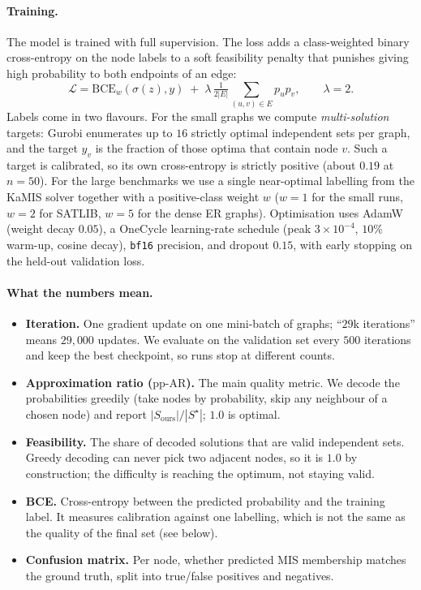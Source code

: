 \documentclass[10pt,a4paper]{article}
\newcommand{\ppar}{\mathrm{pp\text{-}AR}}
\begin{document}
\paragraph{Training.}
The model is trained with full supervision. The loss adds a class-weighted binary
cross-entropy on the node labels to a soft feasibility penalty that punishes
giving high probability to both endpoints of an edge:
\[
\mathcal{L}=\mathrm{BCE}_{w}(\sigma(z),y)
   \;+\;\lambda\,\tfrac{1}{2|E|}\!\!\sum_{(u,v)\in E}\! p_u p_v ,
   \qquad \lambda=2 .
\]
Labels come in two flavours. For the small graphs we compute \emph{multi-solution}
targets: Gurobi enumerates up to $16$ strictly optimal independent sets per graph,
and the target $y_v$ is the fraction of those optima that contain node $v$. Such a
target is calibrated, so its own cross-entropy is strictly positive (about $0.19$
at $n{=}50$). For the large benchmarks we use a single near-optimal labelling from
the KaMIS solver together with a positive-class weight $w$ ($w{=}1$ for the small
runs, $w{=}2$ for SATLIB, $w{=}5$ for the dense ER graphs). Optimisation uses AdamW
(weight decay $0.05$), a OneCycle learning-rate schedule (peak $3\times10^{-4}$,
$10\%$ warm-up, cosine decay), \texttt{bf16} precision, and dropout $0.15$, with
early stopping on the held-out validation loss.

\paragraph{What the numbers mean.}
\begin{itemize}\itemsep0.5pt
  \item \textbf{Iteration.} One gradient update on one mini-batch of graphs; ``$29$k
    iterations'' means $29{,}000$ updates. We evaluate on the validation set every
    $500$ iterations and keep the best checkpoint, so runs stop at different counts.
  \item \textbf{Approximation ratio ($\ppar$).} The main quality metric. We decode
    the probabilities greedily (take nodes by probability, skip any neighbour of a
    chosen node) and report $|S_{\text{ours}}|/|S^\star|$; $1.0$ is optimal.
  \item \textbf{Feasibility.} The share of decoded solutions that are valid
    independent sets. Greedy decoding can never pick two adjacent nodes, so it is
    $1.0$ by construction; the difficulty is reaching the optimum, not staying valid.
  \item \textbf{BCE.} Cross-entropy between the predicted probability and the
    training label. It measures calibration against one labelling, which is not the
    same as the quality of the final set (see below).
  \item \textbf{Confusion matrix.} Per node, whether predicted MIS membership
    matches the ground truth, split into true/false positives and negatives.
\end{itemize}
\end{document}
